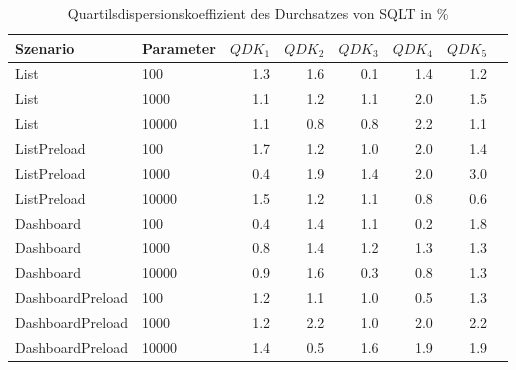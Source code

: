 
\begin{table}[ht]
\setlength{\extrarowheight}{-1pt}
\centering
\caption{Quartilsdispersionskoeffizient des Durchsatzes von SQLT in \%}
\begin{tabular}{llrrrrrr}
\toprule
Szenario & Parameter & ${QDK_1}$ & ${QDK_2}$ & ${QDK_3}$& ${QDK_4}$ & ${QDK_5}$ \\
\midrule
	List & 100 &  1.3 &  1.6 &  0.1 &  1.4 &  1.2 \\
	List & 1000 &  1.1 &  1.2 &  1.1 & \cellcolor{red!11}  2.0 &  1.5 \\
	List & 10000 &  1.1 &  0.8 &  0.8 & \cellcolor{red!11}  2.2 &  1.1 \\
	ListPreload & 100 &  1.7 &  1.2 &  1.0 & \cellcolor{red!11}  2.0 &  1.4 \\
	ListPreload & 1000 &  0.4 &  1.9 &  1.4 &  2.0 & \cellcolor{red!11}  3.0 \\
	ListPreload & 10000 &  1.5 &  1.2 &  1.1 &  0.8 &  0.6 \\
	Dashboard & 100 &  0.4 &  1.4 &  1.1 &  0.2 &  1.8 \\
	Dashboard & 1000 &  0.8 &  1.4 &  1.2 &  1.3 &  1.3 \\
	Dashboard & 10000 &  0.9 &  1.6 &  0.3 &  0.8 &  1.3 \\
	DashboardPreload & 100 &  1.2 &  1.1 &  1.0 &  0.5 &  1.3 \\
	DashboardPreload & 1000 &  1.2 & \cellcolor{red!11}  2.2 &  1.0 &  2.0 & \cellcolor{red!11}  2.2 \\
	DashboardPreload & 10000 &  1.4 &  0.5 &  1.6 &  1.9 &  1.9 \\
\bottomrule
\end{tabular}
\label{tab:quartilsdispersionskoeffizient_durchsatz_sqlt}
\end{table}
	